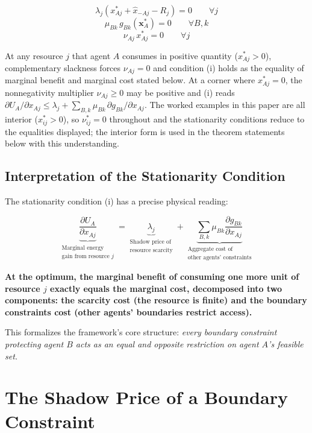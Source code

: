 \documentclass[11pt]{article}
\theoremstyle{plain}
\theoremstyle{definition}
\theoremstyle{remark}
\let\origsection\section
\renewcommand{\section}{\needspace{12\baselineskip}\origsection}
\let\origsubsection\subsection
\renewcommand{\subsection}{\needspace{7\baselineskip}\origsubsection}
\begin{document}
\[\lambda_j \left( x_{Aj}^* + \hat{x}_{-Aj} - R_j \right) = 0 \qquad \forall j\]
\[\mu_{Bk} \, g_{Bk}(\mathbf{x}_A^*) = 0 \qquad \forall B, k\]
\[\nu_{Aj} \, x_{Aj}^* = 0 \qquad \forall j\]

At any resource \(j\) that agent \(A\) consumes in positive quantity
(\(x_{Aj}^* > 0\)), complementary slackness forces \(\nu_{Aj} = 0\) and
condition (i) holds as the equality of marginal benefit and marginal
cost stated below. At a corner where \(x_{Aj}^* = 0\), the nonnegativity
multiplier \(\nu_{Aj} \geq 0\) may be positive and (i) reads
\(\partial U_A / \partial x_{Aj} \leq \lambda_j + \sum_{B,k} \mu_{Bk}\, \partial g_{Bk}/\partial x_{Aj}\).
The worked examples in this paper are all interior (\(x_{ij}^* > 0\)),
so \(\nu_{ij}^* = 0\) throughout and the stationarity conditions reduce
to the equalities displayed; the interior form is used in the theorem
statements below with this understanding.

\subsection{Interpretation of the Stationarity
Condition}\label{interpretation-of-the-stationarity-condition}

The stationarity condition (i) has a precise physical reading:

\[\underbrace{\frac{\partial U_A}{\partial x_{Aj}}}_{\substack{\text{Marginal energy} \\ \text{gain from resource } j}} = \underbrace{\lambda_j}_{\substack{\text{Shadow price of} \\ \text{resource scarcity}}} + \underbrace{\sum_{B,k} \mu_{Bk} \frac{\partial g_{Bk}}{\partial x_{Aj}}}_{\substack{\text{Aggregate cost of} \\ \text{other agents' constraints}}}\]

\textbf{At the optimum, the marginal benefit of consuming one more unit
of resource \(j\) exactly equals the marginal cost, decomposed into two
components: the scarcity cost (the resource is finite) and the boundary
constraints cost (other agents' boundaries restrict access).}

This formalizes the framework's core structure: \emph{every boundary
constraint protecting agent \(B\) acts as an equal and opposite
restriction on agent \(A\)'s feasible set.}

\section{The Shadow Price of a Boundary
Constraint}\label{the-shadow-price-of-a-boundary-constraint}
\end{document}
